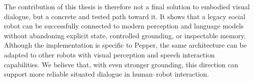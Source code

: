 The contribution of this thesis is therefore not a final solution to embodied visual dialogue, but a concrete and tested path toward it. It shows that a legacy social robot can be successfully connected to modern perception and language models without abandoning explicit state, controlled grounding, or inspectable memory. Although the implementation is specific to Pepper, the same architecture can be adapted to other robots with visual perception and speech interaction capabilities. We believe that, with even stronger grounding, this direction can support more reliable situated dialogue in human--robot interaction.
